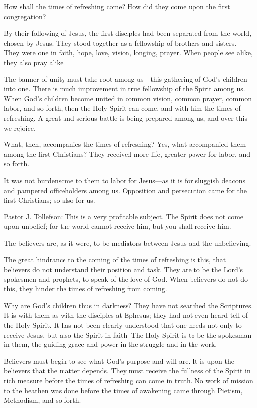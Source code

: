 How shall the times of refreshing come? How did they come upon the first congregation?

By their following of Jesus, the first disciples had been separated from the world, chosen by Jesus. They stood together as a fellowship of brothers and sisters. They were one in faith, hope, love, vision, longing, prayer. When people see alike, they also pray alike.

The banner of unity must take root among us—this gathering of God’s children into one. There is much improvement in true fellowship of the Spirit among us. When God’s children become united in common vision, common prayer, common labor, and so forth, then the Holy Spirit can come, and with him the times of refreshing. A great and serious battle is being prepared among us, and over this we rejoice.

What, then, accompanies the times of refreshing? Yes, what accompanied them among the first Christians? They received more life, greater power for labor, and so forth.

It was not burdensome to them to labor for Jesus—as it is for sluggish deacons and pampered officeholders among us. Opposition and persecution came for the first Christians; so also for us.

Pastor J. Tollefson: This is a very profitable subject. The Spirit does not come upon unbelief; for the world cannot receive him, but you shall receive him.

The believers are, as it were, to be mediators between Jesus and the unbelieving.

The great hindrance to the coming of the times of refreshing is this, that believers do not understand their position and task. They are to be the Lord’s spokesmen and prophets, to speak of the love of God. When believers do not do this, they hinder the times of refreshing from coming.

Why are God’s children thus in darkness? They have not searched the Scriptures. It is with them as with the disciples at Ephesus; they had not even heard tell of the Holy Spirit. It has not been clearly understood that one needs not only to receive Jesus, but also the Spirit in faith. The Holy Spirit is to be the spokesman in them, the guiding grace and power in the struggle and in the work.

Believers must begin to see what God’s purpose and will are. It is upon the believers that the matter depends. They must receive the fullness of the Spirit in rich measure before the times of refreshing can come in truth. No work of mission to the heathen was done before the times of awakening came through Pietism, Methodism, and so forth.

